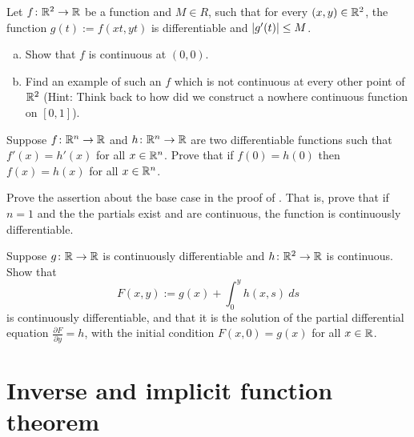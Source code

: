 \begin{samepage}
\begin{exercise}
Let $f \colon {\mathbb{R}}^2 \to {\mathbb{R}}$ be a function and
$M \in R$, such that
for every $(x,y) \in {\mathbb{R}}^2$, the function $g(t) := f(xt,yt)$ is
differentiable
and $\lvert {g'(t)} \rvert \leq M$.
\begin{enumerate}[a)]
\item
Show that $f$ is continuous at $(0,0)$.
\item
Find an example of such an $f$ which is not continuous at every other point of
${\mathbb{R}}^2$ (Hint: Think back to how did we construct a nowhere continuous function on $[0,1]$).
\end{enumerate}
\end{exercise}
\end{samepage}

\begin{exercise}
Suppose $f \colon {\mathbb{R}}^n \to {\mathbb{R}}$ and $h \colon {\mathbb{R}}^n \to {\mathbb{R}}$ are two 
differentiable functions such that $f'(x) = h'(x)$ for all $x \in {\mathbb{R}}^n$.
Prove that
if $f(0) = h(0)$ then $f(x) = h(x)$ for all $x \in {\mathbb{R}}^n$.
\end{exercise}

\begin{exercise}
Prove the assertion about the base case
in the proof of .  That is, prove that
if $n=1$ and the
the partials exist and are continuous, the function is continuously
differentiable.
\end{exercise}

\begin{exercise}
Suppose $g \colon {\mathbb{R}} \to {\mathbb{R}}$ is continuously differentiable and
$h \colon {\mathbb{R}}^2 \to {\mathbb{R}}$ is continuous.  Show that
\begin{equation*}
F(x,y) := g(x) + \int_0^y h(x,s) ~ds
\end{equation*}
is continuously differentiable, and that it is the solution of 
the partial differential equation $\frac{\partial F}{\partial y} = h$,
with the initial condition $F(x,0) = g(x)$ for all $x \in {\mathbb{R}}$.
\end{exercise}



\sectionnewpage
\section{Inverse and implicit function theorem}
\label{sec:svinvfuncthm}


